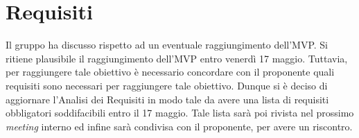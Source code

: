 \section{Requisiti}

Il gruppo ha discusso rispetto ad un eventuale raggiungimento dell'MVP. Si
ritiene plausibile il raggiungimento dell'MVP entro venerdì 17 maggio. Tuttavia,
per raggiungere tale obiettivo è necessario concordare con il proponente quali
requisiti sono necessari per raggiungere tale obiettivo. Dunque si è deciso di
aggiornare l'Analisi dei Requisiti in modo tale da avere una lista di requisiti
obbligatori soddifacibili entro il 17 maggio. Tale lista sarà poi rivista nel
prossimo \textit{meeting} interno ed infine sarà condivisa con il proponente,
per avere un riscontro.
